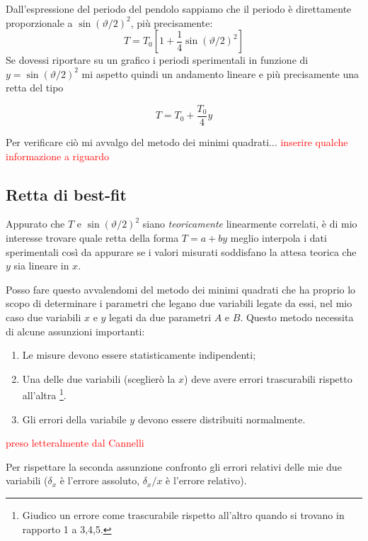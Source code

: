 \documentclass{article}
\begin{document}
\noindent
Dall'espressione del periodo del pendolo sappiamo che il periodo è direttamente proporzionale a $\sin\left(\vartheta/2\right)^2$, più precisamente:
\[
T = T_0 \left[ 1 + \frac{1}{4}\sin{\left(\vartheta/2\right)}^2 \right]
\]
Se dovessi riportare su un grafico i periodi sperimentali in funzione di $y = \sin{\left(\vartheta/2\right)}^2$ mi aspetto quindi un andamento lineare e più precisamente una retta del tipo

\[
T = T_0 + \frac{T_0}{4}y
\]

\noindent
Per verificare ciò mi avvalgo del metodo dei minimi quadrati...
\textcolor{red}{inserire qualche informazione a riguardo}

\newpage
\subsection{Retta di best-fit}
Appurato che $T$ e $\sin{\left(\vartheta/2\right)}^2$ siano \textit{teoricamente} linearmente correlati, è di mio interesse trovare quale retta della forma $T = a + by$ meglio interpola i dati sperimentali così da appurare se i valori misurati soddisfano la attesa teorica che $y$ sia lineare in $x$. 

Posso fare questo avvalendomi del metodo dei minimi quadrati che ha  proprio lo scopo di determinare i parametri che legano due variabili legate da essi, nel mio caso due variabili $x$ e $y$ legati da due parametri $A$ e $B$. Questo metodo necessita di alcune assunzioni importanti: 

\begin{enumerate}
	\item Le misure devono essere statisticamente indipendenti;
	\item Una delle due variabili (sceglierò la $x$) deve avere errori trascurabili rispetto all'altra \footnote{Giudico un errore come trascurabile rispetto all'altro quando si trovano in rapporto 1 a 3,4,5.}.
	\item Gli errori della variabile $y$ devono essere distribuiti normalmente.
\end{enumerate}
\textcolor{red}{preso letteralmente dal Cannelli}

\noindent
Per rispettare la seconda assunzione confronto gli errori relativi delle mie due variabili ($\delta_x$ è l'errore assoluto, $\delta_x/x$ è l'errore relativo).
\end{document}
